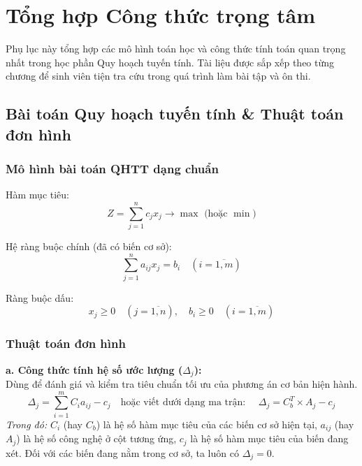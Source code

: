 \chapter{Tổng hợp Công thức trọng tâm}
\label{app:cong_thuc}

Phụ lục này tổng hợp các mô hình toán học và công thức tính toán quan trọng nhất trong học phần Quy hoạch tuyến tính. Tài liệu được sắp xếp theo từng chương để sinh viên tiện tra cứu trong quá trình làm bài tập và ôn thi.

\section{Bài toán Quy hoạch tuyến tính \& Thuật toán đơn hình}
\subsection{Mô hình bài toán QHTT dạng chuẩn}
Hàm mục tiêu:
\begin{equation}
    Z = \sum_{j=1}^{n} c_j x_j \rightarrow \max \text{ (hoặc } \min\text{)}
\end{equation}

Hệ ràng buộc chính (đã có biến cơ sở):
\begin{equation}
    \sum_{j=1}^{n} a_{ij} x_j = b_i \quad (i = \overline{1,m})
\end{equation}

Ràng buộc dấu:
\begin{equation}
    x_j \ge 0 \quad (j = \overline{1,n}), \quad b_i \ge 0 \quad (i = \overline{1,m})
\end{equation}

\subsection{Thuật toán đơn hình}
\textbf{a. Công thức tính hệ số ước lượng ($\Delta_j$):}\\
Dùng để đánh giá và kiểm tra tiêu chuẩn tối ưu của phương án cơ bản hiện hành.
\begin{equation}
    \Delta_j = \sum_{i=1}^{m} C_i a_{ij} - c_j \quad \text{hoặc viết dưới dạng ma trận: } \quad \Delta_j = C_b^T \times A_j - c_j
\end{equation}
\textit{Trong đó:} $C_i$ (hay $C_b$) là hệ số hàm mục tiêu của các biến cơ sở hiện tại, $a_{ij}$ (hay $A_j$) là hệ số công nghệ ở cột tương ứng, $c_j$ là hệ số hàm mục tiêu của biến đang xét. Đối với các biến đang nằm trong cơ sở, ta luôn có $\Delta_j = 0$.

